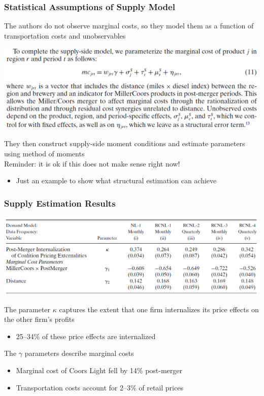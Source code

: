 \documentclass{beamer}
\begin{document}
\begin{frame}\frametitle{Statistical Assumptions of Supply Model}
    The authors do not observe marginal costs, so they model them as a function of transportation costs and unobservables
    \begin{center}
        \includegraphics[width=0.95\linewidth]{eq_11}
    \end{center}
    They then construct supply-side moment conditions and estimate parameters using method of moments \\
    \vspace{2ex}
    Reminder: it is ok if this does not make sense right now!
    \begin{itemize}
        \item Just an example to show what structural estimation can achieve
    \end{itemize}
\end{frame}

\begin{frame}\frametitle{Supply Estimation Results}
    \begin{center}
        \includegraphics[width=0.95\linewidth]{table_6}
    \end{center}
    The parameter $\kappa$ captures the extent that one firm internalizes its price effects on the other firm's profits
    \begin{itemize}
        \item 25--34\% of these price effects are internalized
    \end{itemize}
    \vspace{2ex}
    The $\gamma$ parameters describe marginal costs
    \begin{itemize}
        \item Marginal cost of Coors Light fell by 14\% post-merger
        \item Transportation costs account for 2--3\% of retail prices
    \end{itemize}
\end{frame}
\end{document}
